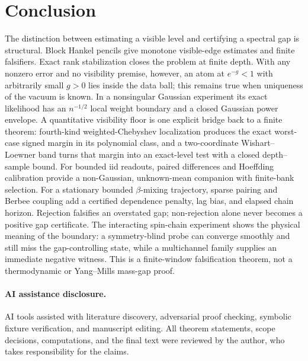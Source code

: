 \documentclass[11pt]{article}
\theoremstyle{definition}
\theoremstyle{remark}
\begin{document}
\section{Conclusion}

The distinction between estimating a visible level and certifying a spectral
gap is structural.  Block Hankel pencils give monotone visible-edge estimates
and finite falsifiers.  Exact rank stabilization closes the problem at finite
depth.  With any nonzero error and no visibility premise, however, an atom at
$e^{-g}<1$ with arbitrarily small $g>0$ lies inside the data ball; this remains
true when uniqueness of the vacuum is known.  In a nonsingular Gaussian
experiment its exact likelihood has an $n^{-1/2}$ local weight boundary and a
closed Gaussian power envelope.  A quantitative visibility floor is one
explicit bridge back to a finite theorem: fourth-kind weighted-Chebyshev
localization produces the exact worst-case signed margin in its polynomial
class, and a two-coordinate Wishart--Loewner band turns that margin into an
exact-level test with a closed depth--sample bound.  For bounded iid readouts,
paired differences and Hoeffding
calibration provide a non-Gaussian, unknown-mean companion with finite-bank
selection.  For a stationary bounded $\beta$-mixing trajectory, sparse pairing
and Berbee coupling add a certified dependence penalty, lag bias, and elapsed
chain horizon.  Rejection falsifies an overstated gap; non-rejection alone never
becomes a positive gap certificate.  The interacting spin-chain experiment shows the physical
meaning of the boundary: a symmetry-blind probe can converge smoothly and
still miss the gap-controlling state, while a multichannel family supplies an
immediate negative witness.  This is a finite-window falsification theorem, not a
thermodynamic or Yang--Mills mass-gap proof.

\paragraph{AI assistance disclosure.}
AI tools assisted with literature discovery, adversarial proof checking,
symbolic fixture verification, and manuscript editing.  All theorem statements,
scope decisions, computations, and the final text were reviewed by the author,
who takes responsibility for the claims.
\end{document}
